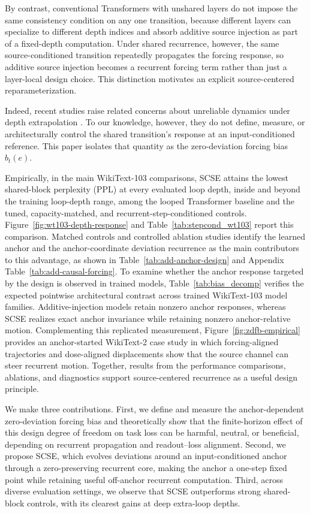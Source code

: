 \documentclass[letterpaper]{article} %
\newcommand{\SCSE}{\textsc{SCSE}}
\theoremstyle{remark}
\begin{document}
\noindent By contrast, conventional Transformers with unshared layers do not impose the same consistency condition on any one transition, because different layers can specialize to different depth indices and absorb additive source injection as part of a fixed-depth computation.  Under shared recurrence, however, the same source-conditioned transition repeatedly propagates the forcing response, so additive source injection becomes a recurrent forcing term rather than just a layer-local design choice.  This distinction motivates an explicit source-centered reparameterization.

Indeed, recent studies raise related concerns about unreliable dynamics under depth extrapolation \citep{prairie2026parcae,yang2026stars,park2026loopus,sharma2026readout}.  To our knowledge, however, they do not define, measure, or architecturally control the shared transition's response at an input-conditioned reference.  This paper isolates that quantity as the zero-deviation forcing bias $b_t(e)$.

Empirically, in the main WikiText-103 comparisons, \SCSE{} attains the lowest shared-block perplexity (PPL) at every evaluated loop depth, inside and beyond the training loop-depth range, among the looped Transformer baseline and the tuned, capacity-matched, and recurrent-step-conditioned controls.  Figure~\ref{fig:wt103-depth-response} and Table~\ref{tab:stepcond_wt103} report this comparison.  Matched controls and controlled ablation studies identify the learned anchor and the anchor-coordinate deviation recurrence as the main contributors to this advantage, as shown in Table~\ref{tab:add-anchor-design} and Appendix Table~\ref{tab:add-causal-forcing}.  To examine whether the anchor response targeted by the design is observed in trained models, Table~\ref{tab:bias_decomp} verifies the expected pointwise architectural contrast across trained WikiText-103 model families.  Additive-injection models retain nonzero anchor responses, whereas \SCSE{} realizes exact anchor invariance while retaining nonzero anchor-relative motion.  Complementing this replicated measurement, Figure~\ref{fig:zdfb-empirical} provides an anchor-started WikiText-2 case study in which forcing-aligned trajectories and dose-aligned displacements show that the source channel can steer recurrent motion.  Together, results from the performance comparisons, ablations, and diagnostics support source-centered recurrence as a useful design principle.

We make three contributions.  First, we define and measure the anchor-dependent zero-deviation forcing bias and theoretically show that the finite-horizon effect of this design degree of freedom on task loss can be harmful, neutral, or beneficial, depending on recurrent propagation and readout--loss alignment.  Second, we propose \SCSE{}, which evolves deviations around an input-conditioned anchor through a zero-preserving recurrent core, making the anchor a one-step fixed point while retaining useful off-anchor recurrent computation.  Third, across diverse evaluation settings, we observe that \SCSE{} outperforms strong shared-block controls, with its clearest gains at deep extra-loop depths.
\end{document}
